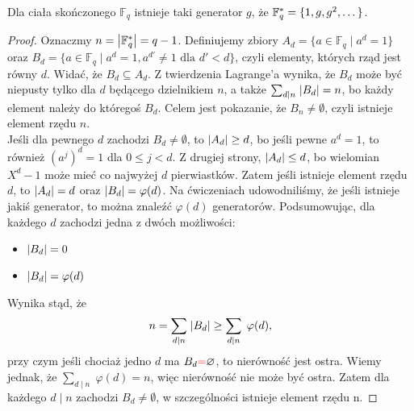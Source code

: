 \begin{theorem}
Dla ciała skończonego \( \mathbb{F}_q \) istnieje taki generator \( g \), że \( \mathbb{F}^{*}_q = \{1, g, g^2, \text{\dots}\} \).
\end{theorem}
\begin{proof}
    Oznaczmy \( n = \abs{\mathbb{F}^{*}_q} = q-1 \). Definiujemy zbiory \( A_d = \{a \in \mathbb{F}_q \mid a^d = 1\} \) oraz \( B_d = \{a \in \mathbb{F}_q \mid a^d = 1, a^{d'} \neq 1 \text{ dla } d' < d\} \), czyli elementy, których rząd jest równy \( d \). Widać, że \( B_d \subseteq A_d \). Z twierdzenia Lagrange'a wynika, że \( B_d \) może być niepusty tylko dla \( d \) będącego dzielnikiem \( n \), a także \( \sum_{d \mid n}\; \abs{B_d} = n \), bo każdy element należy do któregoś \( B_d \). Celem jest pokazanie, że \( B_n \neq \emptyset \), czyli istnieje element rzędu \( n \). \\
    Jeśli dla pewnego \( d \) zachodzi \( B_d \neq \emptyset \), to \( \abs{A_d} \geq d \), bo jeśli pewne \( a^d = 1 \), to również \( (a^j)^d = 1 \) dla \( 0 \leq j < d \). Z drugiej strony, \( \abs{A_d} \leq d \), bo wielomian \( X^d-1 \) może mieć co najwyżej \( d \) pierwiastków. Zatem jeśli istnieje element rzędu \( d \), to \( \abs{A_d} = d \) oraz \( \abs{B_d} = \varphi(d) \). Na ćwiczeniach udowodniliśmy, że jeśli istnieje jakiś generator, to można znaleźć \( \varphi(d) \) generatorów.
    Podsumowując, dla każdego \( d \) zachodzi jedna z dwóch możliwości:
    \begin{itemize}
        \item \( \abs{B_d} = 0 \)
        \item \( \abs{B_d} = \varphi(d) \)
    \end{itemize}
    Wynika stąd, że
    \[
        n = \sum_{d \mid n}\; \abs{B_d} \geq \sum_{d \mid n}\; \varphi(d), 
    \]
    przy czym jeśli chociaż jedno \( d \) ma \( B_d \textcolor{red}{=} \emptyset \), to nierówność jest ostra. Wiemy jednak, że \( \sum_{d \mid n}\; \varphi(d) = n \), więc nierówność nie może być ostra. Zatem dla każdego \( d \mid n \) zachodzi \( B_d \neq \emptyset \), w szczególności istnieje element rzędu n.
\end{proof}